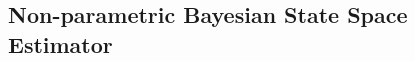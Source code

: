 \begin{appendices}
\chapter{Non-parametric Bayesian State Space Estimator}\label{ch5:appendix}




\end{appendices}

